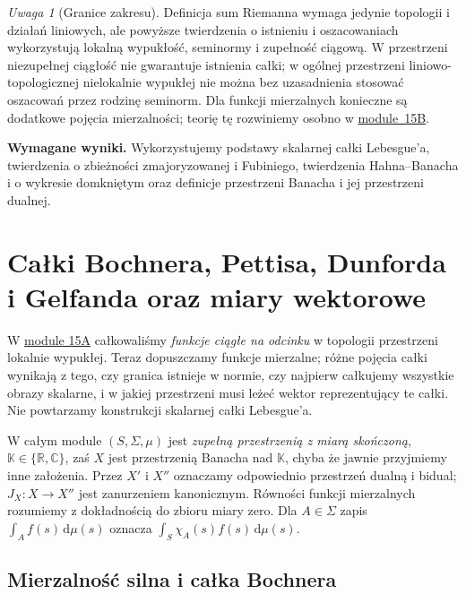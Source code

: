 \documentclass[11pt,a4paper]{article}
\numberwithin{equation}{section}
\theoremstyle{plain}
\theoremstyle{definition}
\theoremstyle{remark}
\newtheorem{uwaga}[twierdzenie]{Uwaga}
\newcommand{\R}{\mathbb R}
\newcommand{\C}{\mathbb C}
\newcommand{\K}{\mathbb K}
\begin{document}
\begin{uwaga}[Granice zakresu]
Definicja sum Riemanna wymaga jedynie topologii i działań liniowych,
ale powyższe twierdzenia o istnieniu i oszacowaniach wykorzystują
lokalną wypukłość, seminormy i zupełność ciągową. W przestrzeni
niezupełnej ciągłość nie gwarantuje istnienia całki; w ogólnej
przestrzeni liniowo-topologicznej nielokalnie wypukłej nie można
bez uzasadnienia stosować oszacowań przez rodzinę seminorm.
Dla funkcji mierzalnych konieczne są dodatkowe pojęcia mierzalności;
teorię tę rozwiniemy osobno w \hyperref[sec:integral-vector15b]{module~15B}.
\end{uwaga}

\addtocounter{section}{-1}
\endgroup


\setcounter{section}{15}
\noindent\textbf{Wymagane wyniki.} Wykorzystujemy podstawy skalarnej całki Lebesgue'a, twierdzenia o zbieżności zmajoryzowanej i Fubiniego, twierdzenia Hahna--Banacha i o wykresie domkniętym oraz definicje przestrzeni Banacha i jej przestrzeni dualnej.\medskip
\begingroup
\renewcommand{\thesection}{15B}
\renewcommand{\theHsection}{15B}
\section{Całki Bochnera, Pettisa, Dunforda i Gelfanda oraz miary wektorowe}
\label{sec:integral-vector15b}

W \hyperref[sec:integral-lcs15a]{module 15A} całkowaliśmy \emph{funkcje ciągłe na odcinku} w topologii
przestrzeni lokalnie wypukłej. Teraz dopuszczamy funkcje mierzalne;
różne pojęcia całki wynikają z tego, czy granica istnieje w normie,
czy najpierw całkujemy wszystkie obrazy skalarne, i w jakiej przestrzeni
musi leżeć wektor reprezentujący te całki. Nie powtarzamy konstrukcji
skalarnej całki Lebesgue'a.

W całym module $(S,\Sigma,\mu)$ jest \emph{zupełną przestrzenią z miarą
skończoną}, $\K\in\{\R,\C\}$, zaś $X$ jest przestrzenią Banacha nad
$\K$, chyba że jawnie przyjmiemy inne założenia. Przez $X'$ i $X''$
oznaczamy odpowiednio przestrzeń dualną i bidual; $J_X:X\to X''$
jest zanurzeniem kanonicznym. Równości funkcji mierzalnych rozumiemy
z dokładnością do zbioru miary zero. Dla $A\in\Sigma$ zapis
$\int_A f(s)\,\mathrm d\mu(s)$ oznacza $\int_S\chi_A(s)f(s)\,\mathrm d\mu(s)$.

\subsection{Mierzalność silna i całka Bochnera}
\end{document}
